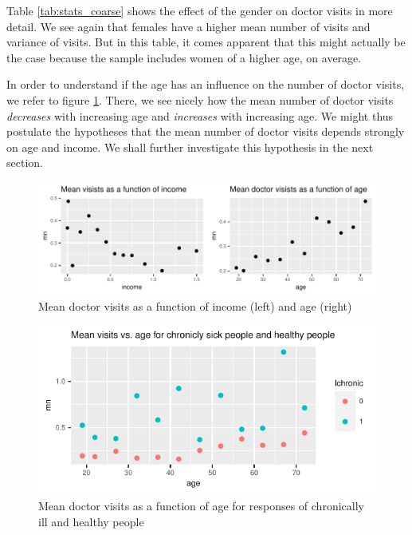 \documentclass[a4paper,11pt]{article}
\begin{document}


Table \ref{tab:stats_coarse} shows the effect of the gender on doctor visits in more detail. We see again that females have a higher mean number of visits and variance of visits. But in this table, it comes apparent that this might actually be the case because the sample includes women of a higher age, on average.

In order to understand if the age has an influence on the number of doctor visits, we refer to figure \ref{fig:scatter_income_and_age}. There, we see nicely how the mean number of doctor visits \emph{decreases} with increasing age and \emph{increases} with increasing age. We might thus postulate the hypotheses that the mean number of doctor visits depends strongly on age and income. We shall further investigate this hypothesis in the next section.



\begin{figure}[h]
	\centering
\includegraphics{../plots/mean_vs_income_and_age.pdf}
	\caption{Mean doctor visits as a function of income (left) and age (right)}
		\label{fig:scatter_income_and_age}
\end{figure}

\begin{figure}[h]
	\centering
\includegraphics{../plots/mean_vs_age_and_chronic.pdf}

\caption{Mean doctor visits as a function of age for responses of chronically ill and healthy people}
\label{fig:scatter_age_and_chronic}
\end{figure}
\end{document}
